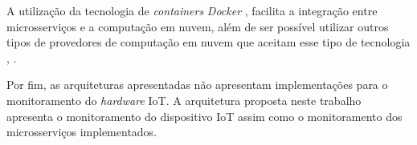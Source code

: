 A utilização da tecnologia de \textit{containers} \textit{Docker} \cite{Vandikas2017}, \cite{Khazaei2017End-to-endApplications} facilita a integração entre microsserviços e a computação em nuvem, além de ser possível utilizar outros tipos de provedores de computação em nuvem que aceitam esse tipo de tecnologia \cite{Vandikas2017}, \cite{Khazaei2017End-to-endApplications}.

Por fim, as arquiteturas apresentadas não apresentam implementações para o monitoramento do \textit{hardware} \acrshort{IoT}. A arquitetura proposta neste trabalho apresenta o monitoramento do dispositivo \acrshort{IoT} assim como o monitoramento dos microsserviços implementados.